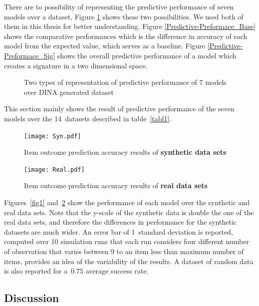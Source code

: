 There are to possibility of representing the predictive performance of seven models over a dataset, Figure \ref{Fig:Predictive-Preformace_rep} shows these two possibilities. We used both of them in this thesis for better understanding. Figure \ref{Predictive-Preformace_Base} shows the comparative performances which is the difference in accuracy of each model from the expected value, which serves as a baseline. Figure \ref{Predictive-Preformace_Sig} shows the overall predictive performance of a model which creates a signature in a two dimensional space.

\begin{figure}[ht]
\centering

\quad
\caption{Two types of representation of predictive performance of 7 models over DINA generated dataset}
\label{Fig:Predictive-Preformace_rep}
\end{figure}

This section mainly shows the result of predictive performance of the seven models over the 14~datasets described in table~\ref{tabl1}. 

\begin{figure}
\centering
\texttt{[image: Syn.pdf]}
\caption{Item outcome prediction accuracy results of {\textbf{synthetic data sets}}}
\label{fig1}

{\texttt{[image: Real.pdf]}}
\caption{Item outcome prediction accuracy results of {\textbf{real data sets}}}
\label{fig2}
\end{figure}


Figures~\ref{fig1} and~\ref{fig2} show the performance of each model over the synthetic and real data sets. Note that the y-scale of the synthetic data is double the one of the real data sets, and therefore the differences in performance for the synthetic datasets are much wider.  An error bar of 1~standard deviation is reported, computed over 10 simulation runs that each run considers four different number of observation that varies between 9 to an item less than maximum number of items, provides an idea of the variability of the results. A dataset of random data is also reported for a~$0.75$ average success rate.

\subsection{Discussion}

